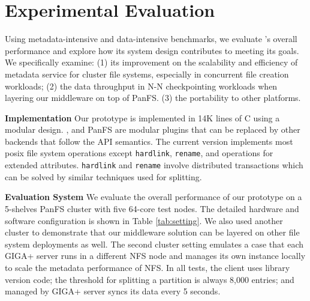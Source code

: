 \section{Experimental Evaluation}

Using metadata-intensive and data-intensive benchmarks,
we evaluate \sys's overall performance
and explore how its system design contributes to meeting its goals.
We specifically examine: (1) its improvement on the scalability and
efficiency of metadata service for cluster file systems,
especially in concurrent file creation workloads;
(2) the data throughput in N-N checkpointing workloads
when layering our middleware on top of PanFS.
(3) the portability to other platforms.

\textbf{Implementation}
Our prototype is implemented in 14K lines of C using a modular design.
\tfs, \ldb and PanFS are modular plugins that can be replaced by other backends
that follow the API semantics. The current version implements most posix
file system operations except \texttt{hardlink}, \texttt{rename},
and operations for extended attributes.
\texttt{hardlink} and \texttt{rename} involve distributed transactions
which can be solved by similar techniques used for splitting.

\textbf{Evaluation System }
We evaluate the overall performance of our prototype on
a 5-shelves PanFS cluster with five 64-core test nodes. The detailed hardware
and software configuration is shown in Table \ref{tab:setting}.
We also used another cluster to demonstrate that our middleware solution
can be layered on other file system deployments as well.
The second cluster setting emulates a case that each GIGA+ server runs in
a different NFS node and manages its own \tfs instance locally
to scale the metadata performance of NFS.
In all tests, the client uses library version code;
the threshold for splitting a partition is always 8,000 entries;
and \tfs managed by GIGA+ server syncs its data every 5 seconds.

